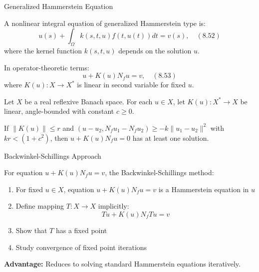 \documentclass[aspectratio=169,10pt]{beamer}
\begin{document}
\begin{frame}{Generalized Hammerstein Equation}
    \begin{definition}
        A nonlinear integral equation of generalized Hammerstein type is:
        \[
            u(s) + \int_{\Omega} k(s, t, u) f(t, u(t)) dt = v(s), \quad (8.52)
        \]
        where the kernel function $k(s, t, u)$ depends on the solution $u$.
    \end{definition}

    \vspace{0.3cm}
    In operator-theoretic terms:
    \[
        u + K(u) N_f u = v, \quad (8.53)
    \]
    where $K(u) : X \to X^*$ is linear in second variable for fixed $u$.

    \vspace{0.3cm}
    \begin{theorem}[Theorem 8.17]
        Let $X$ be a real reflexive Banach space. For each $u \in X$, let
        $K(u) : X^* \to X$ be linear, angle-bounded with constant $c \geq 0$.

        If $\|K(u)\| \leq r$ and $(u - u_2, N_f u_1 - N_f u_2) \geq -k\|u_1 - u_2\|^2$
        with $kr < (1 + c^2)$, then $u + K(u)N_f u = 0$ has at least one solution.
    \end{theorem}
\end{frame}

\begin{frame}{Backwinkel-Schillings Approach}
    \begin{idea}
        For equation $u + K(u)N_f u = v$, the Backwinkel-Schillings method:

        \begin{enumerate}
            \item For fixed $u \in X$, equation $u + K(u)N_f u = v$ is a
                Hammerstein equation in $u$
            \item Define mapping $T : X \to X$ implicitly:
                \[
                    Tu + K(u)N_f Tu = v
                \]
            \item Show that $T$ has a fixed point
            \item Study convergence of fixed point iterations
        \end{enumerate}
    \end{idea}

    \vspace{0.3cm}
    \textbf{Advantage:} Reduces to solving standard Hammerstein equations iteratively.
\end{frame}
\end{document}
